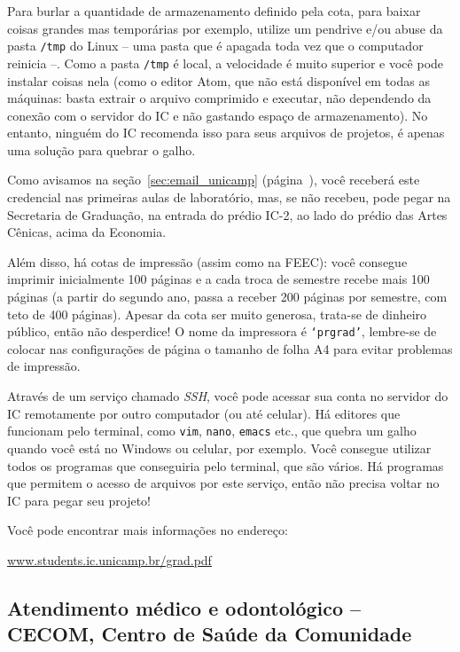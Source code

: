 Para burlar a quantidade de armazenamento definido pela cota, para baixar
coisas grandes mas temporárias por exemplo, utilize um pendrive e/ou abuse da
pasta \texttt{/tmp} do Linux -- uma pasta que é apagada toda vez que o
computador reinicia --. Como a pasta \texttt{/tmp} é local, a velocidade é
muito superior e você pode instalar coisas nela (como o editor Atom, que não
está disponível em todas as máquinas: basta extrair o arquivo comprimido e
executar, não dependendo da conexão com o servidor do IC e não gastando espaço
de armazenamento). No entanto, ninguém do IC recomenda isso para seus arquivos
de projetos, é apenas uma solução para quebrar o galho.

Como avisamos na seção~\ref{sec:email_unicamp}
(página~\pageref{sec:email_unicamp}), você receberá este credencial nas
primeiras aulas de laboratório, mas, se não recebeu, pode pegar na Secretaria
de Graduação, na entrada do prédio IC-2, ao lado do prédio das Artes Cênicas,
acima da Economia.

Além disso, há cotas de impressão (assim como na FEEC): você consegue imprimir
inicialmente 100 páginas e a cada troca de semestre recebe mais 100 páginas (a
partir do segundo ano, passa a receber 200 páginas por semestre, com teto de
400 páginas). Apesar da cota ser muito generosa, trata-se de dinheiro público,
então não desperdice! O nome da impressora é \texttt{`prgrad'}, lembre-se de
colocar nas configurações de página o tamanho de folha A4 para evitar problemas
de impressão.

Através de um serviço chamado \emph{SSH}, você pode acessar sua conta no
servidor do IC remotamente por outro computador (ou até celular). Há editores
que funcionam pelo terminal, como \texttt{vim}, \texttt{nano}, \texttt{emacs}
etc., que quebra um galho quando você está no Windows ou celular, por exemplo.
Você consegue utilizar todos os programas que conseguiria pelo terminal, que
são vários. Há programas que permitem o acesso de arquivos por este serviço,
então não precisa voltar no IC para pegar seu projeto!

Você pode encontrar mais informações no endereço:

\begin{center}
\url{www.students.ic.unicamp.br/grad.pdf}
\end{center}

\subsection{Atendimento médico e odontológico -- CECOM, Centro de Saúde da
Comunidade}

